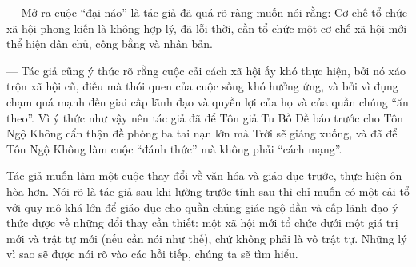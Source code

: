 — Mở ra cuộc ``đại náo'' là tác giả đã quá rõ ràng muốn nói rằng: Cơ chế tổ chức xã hội phong kiến là không hợp lý, đã lỗi thời, cần tổ chức một cơ chế xã hội mới thể hiện dân chủ, công bằng và nhân bản.

— Tác giả cũng ý thức rõ rằng cuộc cải cách xã hội ấy khó thực hiện, bởi nó xáo trộn xã hội cũ, điều mà thói quen của cuộc sống khó hưởng ứng, và bởi vì đụng chạm quá mạnh đến giai cấp lãnh đạo và quyền lợi của họ và của quần chúng ``ăn theo''. Vì ý thức như vậy nên tác giả đã để Tôn giả Tu Bồ Đề báo trước cho Tôn Ngộ Không cẩn thận đề phòng ba tai nạn lớn mà Trời sẽ giáng xuống, và đã để Tôn Ngộ Không làm cuộc ``đánh thức'' mà không phải ``cách mạng''.

Tác giả muốn làm một cuộc thay đổi về văn hóa và giáo dục trước, thực hiện ôn hòa hơn. Nói rõ là tác giả sau khi lường trước tính sau thì chỉ muốn có một cải tổ với quy mô khá lớn để giáo dục cho quần chúng giác ngộ dần và cấp lãnh đạo ý thức được về những đổi thay cần thiết: một xã hội mới tổ chức dưới một giá trị mới và trật tự mới (nếu cần nói như thế), chứ không phải là vô trật tự. Những lý vì sao sẽ được nói rõ vào các hồi tiếp, chúng ta sẽ tìm hiểu.


